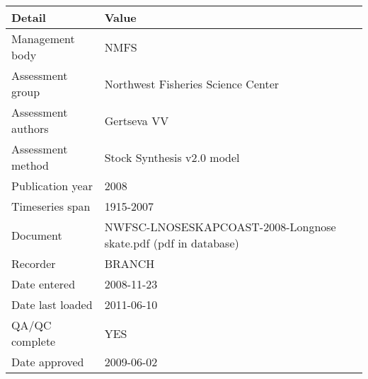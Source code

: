 \begin{table}[htb]
\centering
\begin{tabular}{lp{7cm}}
\toprule
Detail & Value \\
\midrule
Management body    & NMFS                                                           \\
Assessment group   & Northwest Fisheries Science Center                             \\
Assessment authors & Gertseva VV                                                    \\
Assessment method  & Stock Synthesis v2.0 model                                     \\
Publication year   & 2008                                                           \\
Timeseries span    & 1915-2007                                                      \\
Document           & NWFSC-LNOSESKAPCOAST-2008-Longnose skate.pdf (pdf in database) \\
Recorder           & BRANCH                                                         \\
Date entered       & 2008-11-23                                                     \\
Date last loaded   & 2011-06-10                                                     \\
QA/QC complete     & YES                                                            \\
Date approved      & 2009-06-02                                                     \\
\bottomrule
\end{tabular}
\label{tab:assessdet}
\end{table}
